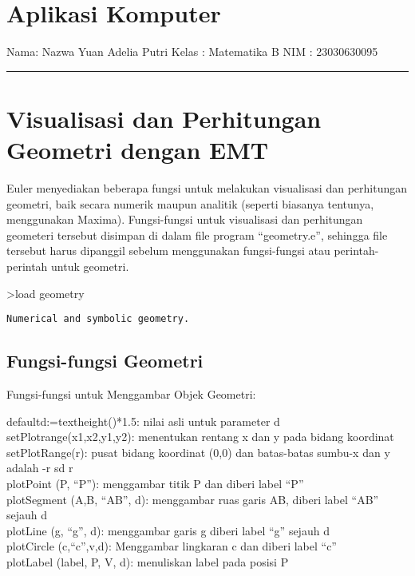 \documentclass[
]{book}
\author{}
\date{}
\begin{document}
\frontmatter

\mainmatter
\chapter{Aplikasi Komputer}\label{aplikasi-komputer}

Nama: Nazwa Yuan Adelia Putri Kelas : Matematika B NIM : 23030630095

\begin{center}\rule{0.5\linewidth}{0.5pt}\end{center}

\chapter{Visualisasi dan Perhitungan Geometri dengan EMT}\label{visualisasi-dan-perhitungan-geometri-dengan-emt}

Euler menyediakan beberapa fungsi untuk melakukan visualisasi dan perhitungan geometri, baik secara numerik maupun analitik (seperti biasanya tentunya, menggunakan Maxima). Fungsi-fungsi untuk visualisasi dan perhitungan geometeri tersebut disimpan di dalam file program ``geometry.e'', sehingga file tersebut harus dipanggil sebelum menggunakan fungsi-fungsi atau perintah-perintah untuk geometri.

\textgreater load geometry

\begin{verbatim}
Numerical and symbolic geometry.
\end{verbatim}

\section{Fungsi-fungsi Geometri}\label{fungsi-fungsi-geometri}

Fungsi-fungsi untuk Menggambar Objek Geometri:

defaultd:=textheight()*1.5: nilai asli untuk parameter d\\
setPlotrange(x1,x2,y1,y2): menentukan rentang x dan y pada bidang koordinat\\
setPlotRange(r): pusat bidang koordinat (0,0) dan batas-batas sumbu-x dan y adalah -r sd r\\
plotPoint (P, ``P''): menggambar titik P dan diberi label ``P''\\
plotSegment (A,B, ``AB'', d): menggambar ruas garis AB, diberi label ``AB'' sejauh d\\
plotLine (g, ``g'', d): menggambar garis g diberi label ``g'' sejauh d\\
plotCircle (c,``c'',v,d): Menggambar lingkaran c dan diberi label ``c''\\
plotLabel (label, P, V, d): menuliskan label pada posisi P
\end{document}
